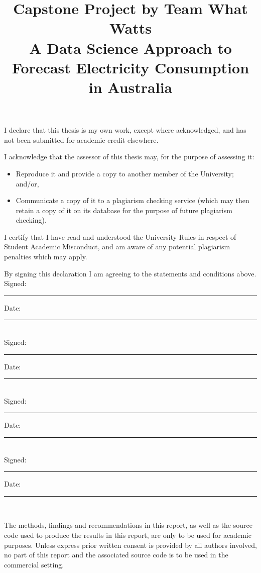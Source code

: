 \documentclass[mstat,12pt]{unswthesis}
\title{Capstone Project by Team What Watts\\[0.5cm]A Data Science
Approach to Forecast Electricity Consumption in Australia}
\author{\Authornameonly}
\begin{document}
\beforepreface




\vskip 2pc \noindent I declare that this thesis is my
own work, except where acknowledged, and has not been submitted for
academic credit elsewhere. 

\vskip 2pc  \noindent I acknowledge that the assessor of this
thesis may, for the purpose of assessing it:
\begin{itemize}
\item Reproduce it and provide a copy to another member of the University; and/or,
\item Communicate a copy of it to a plagiarism checking service (which may then retain a copy of it on its database for the purpose of future plagiarism checking).
\end{itemize}

\vskip 2pc \noindent I certify that I have read and understood the University Rules in
respect of Student Academic Misconduct, and am aware of any potential plagiarism penalties which may 
apply.\vspace{24pt}

\vskip 2pc \noindent By signing 
this declaration I am
agreeing to the statements and conditions above.
\vskip 2pc \noindent
Signed: \rule{7cm}{0.25pt} \hfill Date: \rule{4cm}{0.25pt} \\[1cm]
Signed: \rule{7cm}{0.25pt} \hfill Date: \rule{4cm}{0.25pt} \\[1cm]
Signed: \rule{7cm}{0.25pt} \hfill Date: \rule{4cm}{0.25pt} \\[1cm]
Signed: \rule{7cm}{0.25pt} \hfill Date: \rule{4cm}{0.25pt} \\[1cm]
\vskip 1pc





{\bigskip}The methods, findings and recommendations in this report, as
well as the source code used to produce the results in this report, are
only to be used for academic purposes. Unless express prior written
consent is provided by all authors involved, no part of this report and
the associated source code is to be used in the commercial
setting.\\[1cm] 

\end{document}
